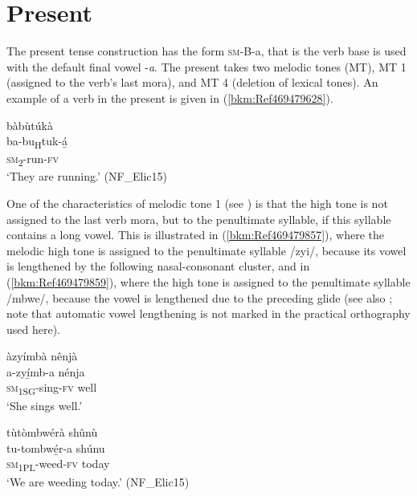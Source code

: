 \section{Present}
\label{bkm:Ref72233436}\hypertarget{Toc75352679}{}
The present tense construction has the form \textsc{sm}-B-a, that is the verb base is used with the default final vowel -\textit{a}. The present takes two melodic tones (MT), MT 1 (assigned to the verb’s last mora), and MT 4 (deletion of lexical tones). An example of a verb in the present is given in (\ref{bkm:Ref469479628}).

\ea
\label{bkm:Ref469479628}
\glll bàbùtúkà\\
ba-bu\textsubscript{H}tuk-á̲\\
\textsc{sm}\textsubscript{2}-run-\textsc{fv}\\
\glt ‘They are running.’ (NF\_Elic15)
\z

One of the characteristics of melodic tone 1 (see ) is that the high tone is not assigned to the last verb mora, but to the penultimate syllable, if this syllable contains a long vowel. This is illustrated in (\ref{bkm:Ref469479857}), where the melodic high tone is assigned to the penultimate syllable /zyi/, because its vowel is lengthened by the following nasal-consonant cluster, and in (\ref{bkm:Ref469479859}), where the high tone is assigned to the penultimate syllable /mbwe/, because the vowel is lengthened due to the preceding glide (see also ; note that automatic vowel lengthening is not marked in the practical orthography used here).

\ea
\label{bkm:Ref469479857}
àzyímbà nênjà \\
\gll a-zyí̲mb-a    nénja\\
\textsc{sm}\textsubscript{1SG}-sing-\textsc{fv}  well\\
\glt ‘She sings well.’
\z

\ea
\label{bkm:Ref469479859}
tùtòmbwérà shûnù\\
\gll tu-tombwé̲r-a  shúnu\\
\textsc{sm}\textsubscript{1PL}-weed-\textsc{fv}  today\\
\glt ‘We are weeding today.’ (NF\_Elic15)
\z

